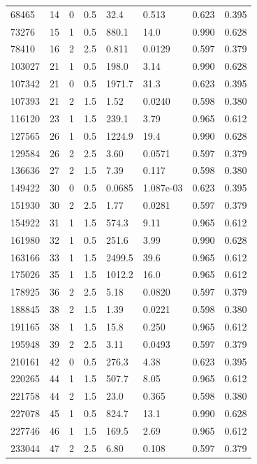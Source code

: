 \documentclass[preview]{standalone}
\begin{document}
{{\begin{tabular}{L{1.2cm}C{1.2cm} C{0.3cm}C{0.5cm} C{1.4cm}C{1.4cm} C{1.4cm}C{1.4cm}}
  68465  &    14  & 0     & 0.5 &  32.4  & 0.513  & 0.623 &  0.395   \\ 
  73276  &    15  & 1     & 0.5 &  880.1  & 14.0  & 0.990 &  0.628   \\ 
  78410  &    16  & 2     & 2.5 &  0.811  & 0.0129  & 0.597 &  0.379   \\ 
  103027  &    21  & 1     & 0.5 &  198.0  & 3.14  & 0.990 &  0.628   \\ 
  107342  &    21  & 0     & 0.5 &  1971.7  & 31.3  & 0.623 &  0.395   \\ 
  107393  &    21  & 2     & 1.5 &  1.52  & 0.0240  & 0.598 &  0.380   \\ 
  116120  &    23  & 1     & 1.5 &  239.1  & 3.79  & 0.965 &  0.612   \\ 
  127565  &    26  & 1     & 0.5 &  1224.9  & 19.4  & 0.990 &  0.628   \\ 
  129584  &    26  & 2     & 2.5 &  3.60  & 0.0571  & 0.597 &  0.379   \\ 
  136636  &    27  & 2     & 1.5 &  7.39  & 0.117  & 0.598 &  0.380   \\ 
  149422  &    30  & 0     & 0.5 &  0.0685  & 1.087e-03  & 0.623 &  0.395   \\ 
  151930  &    30  & 2     & 2.5 &  1.77  & 0.0281  & 0.597 &  0.379   \\ 
  154922  &    31  & 1     & 1.5 &  574.3  & 9.11  & 0.965 &  0.612   \\ 
  161980  &    32  & 1     & 0.5 &  251.6  & 3.99  & 0.990 &  0.628   \\ 
  163166  &    33  & 1     & 1.5 &  2499.5  & 39.6  & 0.965 &  0.612   \\ 
  175026  &    35  & 1     & 1.5 &  1012.2  & 16.0  & 0.965 &  0.612   \\ 
  178925  &    36  & 2     & 2.5 &  5.18  & 0.0820  & 0.597 &  0.379   \\ 
  188845  &    38  & 2     & 1.5 &  1.39  & 0.0221  & 0.598 &  0.380   \\ 
  191165  &    38  & 1     & 1.5 &  15.8  & 0.250  & 0.965 &  0.612   \\ 
  195948  &    39  & 2     & 2.5 &  3.11  & 0.0493  & 0.597 &  0.379   \\ 
  210161  &    42  & 0     & 0.5 &  276.3  & 4.38  & 0.623 &  0.395   \\ 
  220265  &    44  & 1     & 1.5 &  507.7  & 8.05  & 0.965 &  0.612   \\ 
  221758  &    44  & 2     & 1.5 &  23.0  & 0.365  & 0.598 &  0.380   \\ 
  227078  &    45  & 1     & 0.5 &  824.7  & 13.1  & 0.990 &  0.628   \\ 
  227746  &    46  & 1     & 1.5 &  169.5  & 2.69  & 0.965 &  0.612   \\ 
  233044  &    47  & 2     & 2.5 &  6.80  & 0.108  & 0.597 &  0.379   \\ 
\hline 
\end{tabular} 

}}
\end{document}
